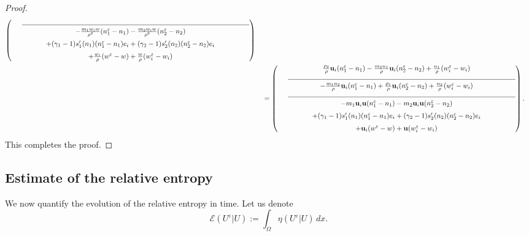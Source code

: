 \documentclass[10pt,reqno]{amsart}
\numberwithin{equation}{section}
\newcommand{\calE}{\mathcal E}
\newcommand{\ve}{\varepsilon}
\begin{document}
\begin{proof}
\begin{align*}
\begin{pmatrix}
            \vtop{\hsize=12cm \hrulefill}\\
            -\frac{m_1  w_i w}{\rho^2} (n_1^\ve - n_1) - \frac{m_2 w_i w}{\rho^2}  (n_2^\ve - n_2) \\[6pt]
            + (\gamma_1-1)s_1'(n_1) (n_1^\ve - n_1) e_i + (\gamma_2-1)s_2'(n_2) (n_2^\ve - n_2)e_i \\[6pt]
            + \frac{w_i}{\rho}(w^\ve - w) + \frac{w}{\rho} (w_i^\ve - w_i)
        \end{pmatrix} \cr
         &\quad = \begin{pmatrix}
            \frac{\rho_2}{\rho} {\bf{u}}_i (n_1^\ve - n_1) - \frac{m_2  n_1}{\rho} {\bf{u}}_i(n_2^\ve - n_2) + \frac{n_1}{\rho} (w_i^\ve - w_i) \\
            \vtop{\hsize=12cm \hrulefill}\\
            -\frac{m_1  n_2}{\rho} {\bf{u}}_i (n_1^\ve-n_1) + \frac{\rho_1}{\rho} {\bf{u}}_i (n_2^\ve - n_2) + \frac{n_2}{\rho}(w_i^\ve - w_i) \\
            \vtop{\hsize=12cm \hrulefill}\\
            - m_1  {\bf{u}}_i {\bf{u}}  (n_1^\ve - n_1) - m_2 {\bf{u}}_i {\bf{u}}  (n_2^\ve - n_2) \\[6pt]
            + (\gamma_1-1)s_1'(n_1) (n_1^\ve - n_1) e_i + (\gamma_2-1)s_2'(n_2) (n_2^\ve - n_2)e_i \\[6pt]
            + {\bf{u}}_i(w^\ve - w) + {\bf{u}} (w_i^\ve - w_i)
        \end{pmatrix}.
    \end{align*}
    This completes the proof.
\end{proof}
%
%
%
%
%
%
%
%



\subsection{Estimate of the relative entropy}
We now quantify the evolution of the relative entropy in time. Let us denote
\[
    \calE(U^\ve|U) := \int_{\Omega} \eta(U^\ve|U)\,dx.
\]
\end{document}
